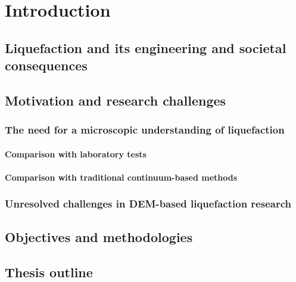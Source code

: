 \documentclass[../main]{subfiles}
\begin{document}
\chapter{Introduction}
\label{ch:introduction}

\section{Liquefaction and its engineering and societal consequences}
\label{sec:liq_consequences}


\section{Motivation and research challenges}
\label{sec:motivation}

\subsection{The need for a microscopic understanding of liquefaction}
\label{subsec:need_micro}

\subsubsection{Comparison with laboratory tests}

\subsubsection{Comparison with traditional continuum-based methods}

\subsection{Unresolved challenges in DEM-based liquefaction research}
\label{subsec:dem_challenges}

\section{Objectives and methodologies}
\label{sec:objectives}

\section{Thesis outline}
\label{sec:outline}

\end{document}
